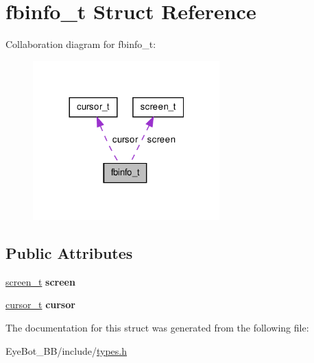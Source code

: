 \hypertarget{structfbinfo__t}{\section{fbinfo\-\_\-t \-Struct \-Reference}
\label{structfbinfo__t}
}


\-Collaboration diagram for fbinfo\-\_\-t\-:\nopagebreak
\begin{figure}[H]
\begin{center}
\leavevmode
\includegraphics[width=204pt]{structfbinfo__t__coll__graph}
\end{center}
\end{figure}
\subsection*{\-Public \-Attributes}
\begin{DoxyCompactItemize}
\item 
\hypertarget{structfbinfo__t_a0c4117c03483b2103958ec54446fb200}{\hyperlink{structscreen__t}{screen\-\_\-t} {\bfseries screen}}\label{structfbinfo__t_a0c4117c03483b2103958ec54446fb200}

\item 
\hypertarget{structfbinfo__t_a0a994ab9381a4c86f1040fe57cee433f}{\hyperlink{structcursor__t}{cursor\-\_\-t} {\bfseries cursor}}\label{structfbinfo__t_a0a994ab9381a4c86f1040fe57cee433f}

\end{DoxyCompactItemize}


\-The documentation for this struct was generated from the following file\-:\begin{DoxyCompactItemize}
\item 
\-Eye\-Bot\-\_\-\-B\-B/include/\hyperlink{types_8h}{types.\-h}\end{DoxyCompactItemize}
